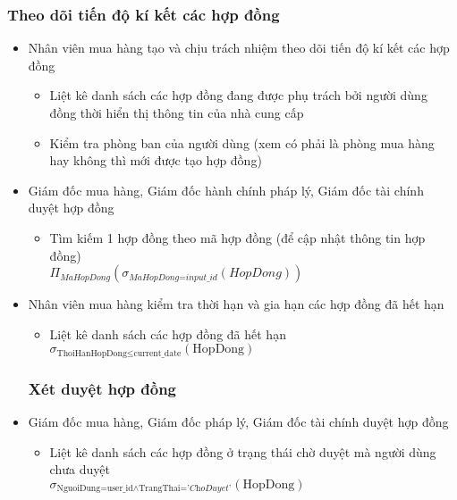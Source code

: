 \documentclass{article}
\begin{document}
	\subsubsection{Theo dõi tiến độ kí kết các hợp đồng}
	\begin{itemize}
		\item Nhân viên mua hàng tạo và chịu trách nhiệm theo dõi tiến độ kí kết các
			hợp đồng
			\begin{itemize}
				\item Liệt kê danh sách các hợp đồng đang được phụ trách bởi người dùng
        đồng thời hiển thị thông tin của nhà cung cấp
				\item Kiểm tra phòng ban của người dùng (xem có phải là phòng mua hàng
					hay không thì mới được tạo hợp đồng)
			\end{itemize}

		\item Giám đốc mua hàng, Giám đốc hành chính pháp lý, Giám đốc tài chính duyệt
			hợp đồng
			\begin{itemize}
				\item Tìm kiếm 1 hợp đồng theo mã hợp đồng (để cập nhật thông tin hợp
					đồng)\\
					$\Pi_{MaHopDong}(\sigma_{\textit{MaHopDong=input\_id}}(\textit{HopDong}))$
			\end{itemize}

		\item Nhân viên mua hàng kiểm tra thời hạn và gia hạn các hợp đồng đã hết hạn
			\begin{itemize}
				\item Liệt kê danh sách các hợp đồng đã hết hạn
					\newline
					$\sigma_{\text{ThoiHanHopDong} \le \text{current\_date}}(\text{HopDong}
					)$
			\end{itemize}

		  \subsubsection{Xét duyệt hợp đồng}

		\item Giám đốc mua hàng, Giám đốc pháp lý, Giám đốc tài chính duyệt hợp đồng
			\begin{itemize}
				\item Liệt kê danh sách các hợp đồng ở trạng thái chờ duyệt mà người dùng
					chưa duyệt\\
					$\sigma_{\text{NguoiDung=user\_id} \wedge \text{TrangThai=}\textit{'ChoDuyet'}}
					(\text{HopDong})$


\end{itemize}
\end{itemize}
\end{document}

